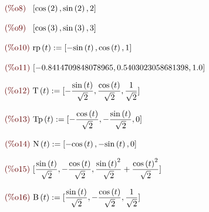 \documentclass[12pt]{article}
\begin{document}
\begin{math}\displaystyle
\parbox{8ex}{\color{labelcolor}(\%o8) }
[\mathrm{cos}\left( 2\right) ,\mathrm{sin}\left( 2\right) ,2]
\end{math}

\begin{math}\displaystyle
\parbox{8ex}{\color{labelcolor}(\%o9) }
[\mathrm{cos}\left( 3\right) ,\mathrm{sin}\left( 3\right) ,3]
\end{math}

\begin{math}\displaystyle
\parbox{8ex}{\color{labelcolor}(\%o10) }
\mathrm{rp}\left( t\right) :=[-\mathrm{sin}\left( t\right) ,\mathrm{cos}\left( t\right) ,1]
\end{math}

\begin{math}\displaystyle
\parbox{8ex}{\color{labelcolor}(\%o11) }
[-0.8414709848078965,0.5403023058681398,1.0]
\end{math}

\begin{math}\displaystyle
\parbox{8ex}{\color{labelcolor}(\%o12) }
\mathrm{T}\left( t\right) :=[-\frac{\mathrm{sin}\left( t\right) }{\sqrt{2}},\frac{\mathrm{cos}\left( t\right) }{\sqrt{2}},\frac{1}{\sqrt{2}}]
\end{math}

\begin{math}\displaystyle
\parbox{8ex}{\color{labelcolor}(\%o13) }
\mathrm{Tp}\left( t\right) :=[-\frac{\mathrm{cos}\left( t\right) }{\sqrt{2}},-\frac{\mathrm{sin}\left( t\right) }{\sqrt{2}},0]
\end{math}

\begin{math}\displaystyle
\parbox{8ex}{\color{labelcolor}(\%o14) }
\mathrm{N}\left( t\right) :=[-\mathrm{cos}\left( t\right) ,-\mathrm{sin}\left( t\right) ,0]
\end{math}

\begin{math}\displaystyle
\parbox{8ex}{\color{labelcolor}(\%o15) }
[\frac{\mathrm{sin}\left( t\right) }{\sqrt{2}},-\frac{\mathrm{cos}\left( t\right) }{\sqrt{2}},\frac{{\mathrm{sin}\left( t\right) }^{2}}{\sqrt{2}}+\frac{{\mathrm{cos}\left( t\right) }^{2}}{\sqrt{2}}]
\end{math}

\begin{math}\displaystyle
\parbox{8ex}{\color{labelcolor}(\%o16) }
\mathrm{B}\left( t\right) :=[\frac{\mathrm{sin}\left( t\right) }{\sqrt{2}},-\frac{\mathrm{cos}\left( t\right) }{\sqrt{2}},\frac{1}{\sqrt{2}}]
\end{math}
\end{document}
